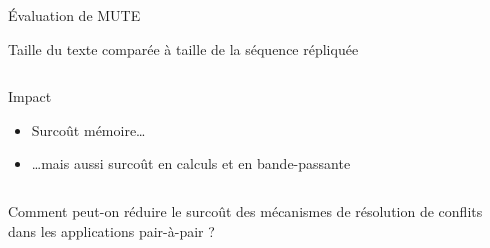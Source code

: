 \begin{frame}{Évaluation de MUTE}
\begin{block}{Taille du texte comparée à taille de la séquence répliquée}
\begin{columns}
\begin{column}{0.4\textwidth}
\begin{center}
                \end{center}
                \pause
                \begin{block}{Impact}
                    \begin{itemize}
                        \item Surcoût \alert{mémoire}\dots
                        \item \dots mais aussi surcoût en \alert{calculs} et en \alert{bande-passante}
                    \end{itemize}
                \end{block}
            \end{column}
        \end{columns}
    \end{block}
\end{frame}

\begin{frame}[standout]
    Comment peut-on réduire le surcoût des mécanismes de résolution de conflits dans les applications pair-à-pair ?
\end{frame}
